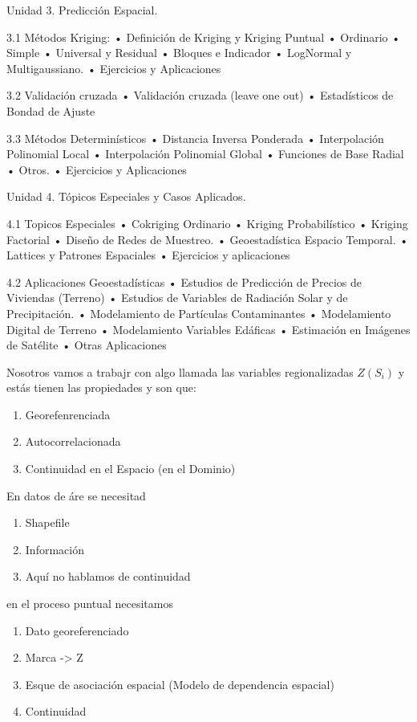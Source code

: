 \documentclass{book}
\begin{document}
Unidad 3. Predicción Espacial.

3.1 Métodos Kriging:
    • Definición de Kriging y Kriging Puntual 
    • Ordinario
    • Simple
    • Universal y Residual
    • Bloques e Indicador
    • LogNormal y Multigaussiano.
    • Ejercicios y Aplicaciones

3.2 Validación cruzada
    • Validación cruzada (leave one out)
    • Estadísticos de Bondad de Ajuste

3.3 Métodos Determinísticos
    • Distancia Inversa Ponderada
    • Interpolación Polinomial Local
    • Interpolación Polinomial Global
    • Funciones de Base Radial
    • Otros.
    • Ejercicios y Aplicaciones

Unidad 4. Tópicos Especiales y Casos Aplicados.

4.1 Topicos Especiales
    • Cokriging Ordinario 
    • Kriging Probabilístico
    • Kriging Factorial
    • Diseño de Redes de Muestreo.
    • Geoestadística Espacio Temporal.
    • Lattices y Patrones Espaciales
    • Ejercicios y aplicaciones

4.2 Aplicaciones Geoestadísticas
    • Estudios de Predicción de Precios de Viviendas (Terreno)
    • Estudios de Variables de Radiación Solar y de Precipitación.
    • Modelamiento de Partículas Contaminantes
    • Modelamiento Digital de Terreno
    • Modelamiento Variables Edáficas
    • Estimación en Imágenes de Satélite
    • Otras Aplicaciones


Nosotros vamos a trabajr con algo llamada las variables regionalizadas $Z(S_i)$ y estás tienen las propiedades y son que: \begin{enumerate}
    \item Georefenrenciada
    \item Autocorrelacionada
    \item Continuidad en el Espacio (en el Dominio)
\end{enumerate}

En datos de áre se necesitad 
\begin{enumerate}
    \item Shapefile
    \item Información
    \item Aquí no hablamos de continuidad
\end{enumerate}

en el proceso puntual necesitamos 
\begin{enumerate}
    \item Dato georeferenciado
    \item Marca -> Z
    \item Esque de asociación espacial (Modelo de dependencia espacial)
    \item Continuidad
\end{enumerate}
\end{document}
